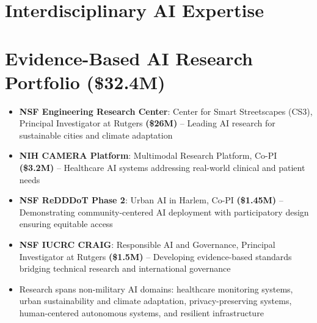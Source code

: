 \documentclass[11pt,letterpaper]{article}
\newcommand{\listentry}[1]{
    \item[\textcolor{accentBlue}{\small\faAngleRight}] #1
}
\begin{document}
\section{Interdisciplinary AI Expertise}
\begin{center}
\end{center}

\section{Evidence-Based AI Research Portfolio (\$32.4M)}
\begin{itemize}
\listentry{\textbf{\color{UNBlue}NSF Engineering Research Center}: Center for Smart Streetscapes (CS3), Principal Investigator at Rutgers \textbf{(\$26M)} -- Leading AI research for sustainable cities and climate adaptation}
\listentry{\textbf{\color{UNBlue}NIH CAMERA Platform}: Multimodal Research Platform, Co-PI \textbf{(\$3.2M)} -- Healthcare AI systems addressing real-world clinical and patient needs}
\listentry{\textbf{\color{UNBlue}NSF ReDDDoT Phase 2}: Urban AI in Harlem, Co-PI \textbf{(\$1.45M)} -- Demonstrating community-centered AI deployment with participatory design ensuring equitable access}
\listentry{\textbf{\color{UNBlue}NSF IUCRC CRAIG}: Responsible AI and Governance, Principal Investigator at Rutgers \textbf{(\$1.5M)} -- Developing evidence-based standards bridging technical research and international governance}
\listentry{Research spans non-military AI domains: healthcare monitoring systems, urban sustainability and climate adaptation, privacy-preserving systems, human-centered autonomous systems, and resilient infrastructure}
\end{itemize}
\end{document}
